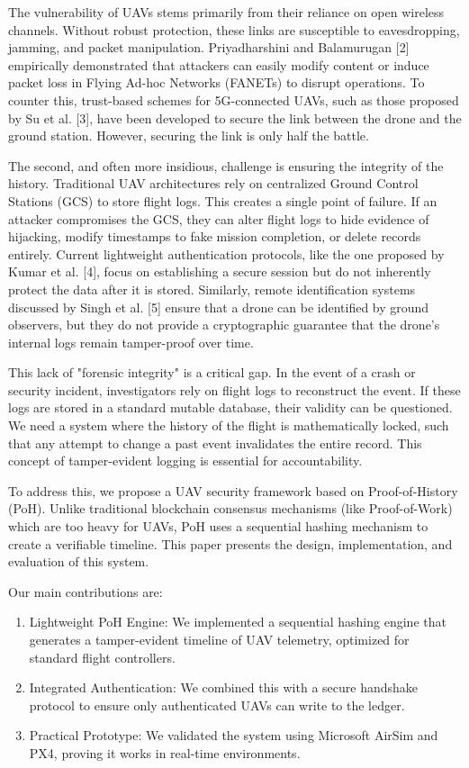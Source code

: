 \documentclass[preprint,12pt]{elsarticle}
\begin{document}
The vulnerability of UAVs stems primarily from their reliance on open wireless channels. Without robust protection, these links are susceptible to eavesdropping, jamming, and packet manipulation. Priyadharshini and Balamurugan [2] empirically demonstrated that attackers can easily modify content or induce packet loss in Flying Ad-hoc Networks (FANETs) to disrupt operations. To counter this, trust-based schemes for 5G-connected UAVs, such as those proposed by Su et al. [3], have been developed to secure the link between the drone and the ground station. However, securing the link is only half the battle.


The second, and often more insidious, challenge is ensuring the integrity of the history. Traditional UAV architectures rely on centralized Ground Control Stations (GCS) to store flight logs. This creates a single point of failure. If an attacker compromises the GCS, they can alter flight logs to hide evidence of hijacking, modify timestamps to fake mission completion, or delete records entirely. Current lightweight authentication protocols, like the one proposed by Kumar et al. [4], focus on establishing a secure session but do not inherently protect the data after it is stored. Similarly, remote identification systems discussed by Singh et al. [5] ensure that a drone can be identified by ground observers, but they do not provide a cryptographic guarantee that the drone's internal logs remain tamper-proof over time.


This lack of "forensic integrity" is a critical gap. In the event of a crash or security incident, investigators rely on flight logs to reconstruct the event. If these logs are stored in a standard mutable database, their validity can be questioned. We need a system where the history of the flight is mathematically locked, such that any attempt to change a past event invalidates the entire record. This concept of tamper-evident logging is essential for accountability.


To address this, we propose a UAV security framework based on Proof-of-History (PoH). Unlike traditional blockchain consensus mechanisms (like Proof-of-Work) which are too heavy for UAVs, PoH uses a sequential hashing mechanism to create a verifiable timeline. This paper presents the design, implementation, and evaluation of this system.


Our main contributions are:
\begin{enumerate}
    \item {Lightweight PoH Engine:} We implemented a sequential hashing engine that generates a tamper-evident timeline of UAV telemetry, optimized for standard flight controllers.
    \item {Integrated Authentication:} We combined this with a secure handshake protocol to ensure only authenticated UAVs can write to the ledger.
    \item {Practical Prototype:} We validated the system using Microsoft AirSim and PX4, proving it works in real-time environments.
\end{enumerate}
\end{document}
